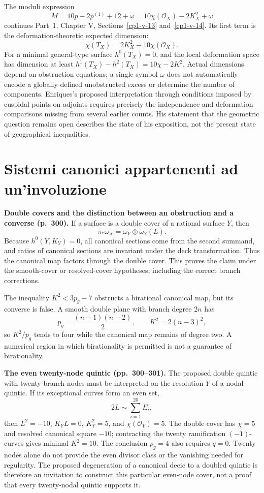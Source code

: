 The moduli expression
\[
M=10p-2p^{(1)}+12+\omega
=10\chi(\mathcal O_X)-2K_X^2+\omega
\]
continues Part~1, Chapter V, Sections~\ref{cp1-v-13} and~\ref{cp1-v-14}. Its first term is the deformation-theoretic expected dimension:
\[
\chi(T_X)=2K_X^2-10\chi(\mathcal O_X).
\]
For a minimal general-type surface \(h^0(T_X)=0\), and the local deformation space has dimension at least \(h^1(T_X)-h^2(T_X)=10\chi-2K^2\). Actual dimensions depend on obstruction equations; a single symbol \(\omega\) does not automatically encode a globally defined unobstructed excess or determine the number of components. Enriques's proposed interpretation through conditions imposed by cuspidal points on adjoints requires precisely the independence and deformation comparisons missing from several earlier counts. His statement that the geometric question remains open describes the state of his exposition, not the present state of geographical inequalities.

\section{Sistemi canonici appartenenti ad un'involuzione}
\label{cp2-viii-13}

\textbf{Double covers and the distinction between an obstruction and a converse (p.~300).}
If a surface is a double cover of a rational surface \(Y\), then
\[
\pi_*\omega_X=\omega_Y\oplus\omega_Y(L).
\]
Because \(h^0(Y,K_Y)=0\), all canonical sections come from the second summand, and ratios of canonical sections are invariant under the deck transformation. Thus the canonical map factors through the double cover. This proves the claim under the smooth-cover or resolved-cover hypotheses, including the correct branch corrections.

The inequality \(K^2<3p_g-7\) obstructs a birational canonical map, but its converse is false. A smooth double plane with branch degree \(2n\) has
\[
p_g=\frac{(n-1)(n-2)}2,\qquad K^2=2(n-3)^2,
\]
so \(K^2/p_g\) tends to four while the canonical map remains of degree two. A numerical region in which birationality is permitted is not a guarantee of birationality.

\textbf{The even twenty-node quintic (pp.~300--301).}
The proposed double quintic with twenty branch nodes must be interpreted on the resolution \(Y\) of a nodal quintic. If its exceptional curves form an even set,
\[
2L\sim\sum_{i=1}^{20}E_i,
\]
then \(L^2=-10\), \(K_YL=0\), \(K_Y^2=5\), and \(\chi(\mathcal O_Y)=5\). The double cover has \(\chi=5\) and resolved canonical square \(-10\); contracting the twenty ramification \((-1)\)-curves gives minimal \(K^2=10\). The conclusion \(p_g=4\) also requires \(q=0\). Twenty nodes alone do not provide the even divisor class or the vanishing needed for regularity. The proposed degeneration of a canonical decic to a doubled quintic is therefore an invitation to construct this particular even-node cover, not a proof that every twenty-nodal quintic supports it.

